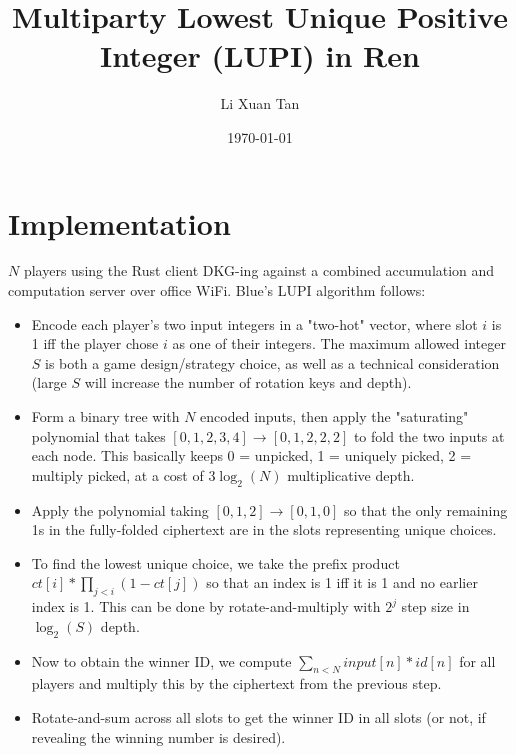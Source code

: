 \documentclass{article}
\title{Multiparty Lowest Unique Positive Integer (LUPI) in Ren}
\author{Li Xuan Tan}
\date{\today}
\begin{document}
\maketitle

\section{Implementation}
$N$ players using the Rust client DKG-ing against a combined accumulation and computation server over office WiFi. 
Blue's LUPI algorithm follows:
\begin{itemize}
    \item Encode each player's two input integers in a "two-hot" vector, where slot $i$ is 1 iff the player chose $i$ as one of their integers. 
    The maximum allowed integer $S$ is both a game design/strategy choice, as well as a technical consideration (large $S$ will increase the number of rotation keys and depth).
    \item Form a binary tree with $N$ encoded inputs, then apply the "saturating" polynomial that takes $[0, 1, 2, 3, 4] \rightarrow [0, 1, 2, 2, 2]$ to fold the two inputs at each node.
    This basically keeps 0 = unpicked, 1 = uniquely picked, 2 = multiply picked, at a cost of $3\log_2(N)$ multiplicative depth.
    \item Apply the polynomial taking $[0, 1, 2] \rightarrow [0, 1, 0]$ so that the only remaining 1s in the fully-folded ciphertext are in the slots representing unique choices.
    \item To find the lowest unique choice, we take the prefix product $ct[i] * \prod_{j<i} (1 - ct[j])$ so that an index is 1 iff it is 1 and no earlier index is 1. 
    This can be done by rotate-and-multiply with $2^j$ step size in $\log_2(S)$ depth.
    \item Now to obtain the winner ID, we compute $\sum_{n<N} input[n] * id[n]$ for all players and multiply this by the ciphertext from the previous step. 
    \item Rotate-and-sum across all slots to get the winner ID in all slots (or not, if revealing the winning number is desired).
\end{itemize}
\end{document}
